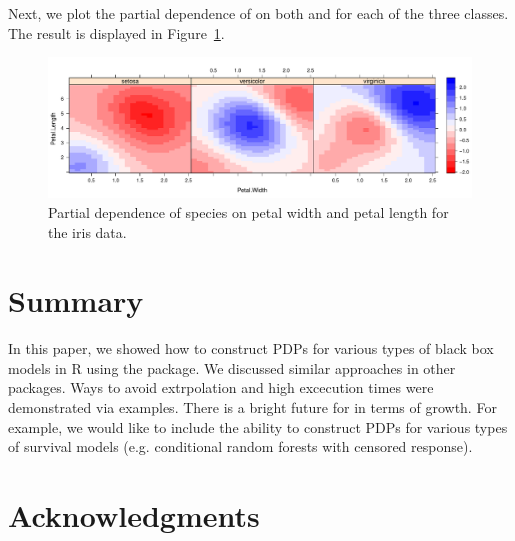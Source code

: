 Next, we plot the partial dependence of  on both  and  for each of the three classes. The result is displayed in Figure~\ref{fig:partial_iris}.

\begin{figure}[htbp]
  \centering
  \includegraphics[width=1.0\linewidth]{partial_iris_svm}
  \caption{Partial dependence of species on petal width and petal length for the iris data.}
  \label{fig:partial_iris}
\end{figure}


\section{Summary}

In this paper, we showed how to construct PDPs for various types of black box models in R using the  package. We discussed similar approaches in other packages. Ways to avoid extrpolation and high excecution times were demonstrated via examples. There is a bright future for  in terms of growth. For example, we would like to include the ability to construct PDPs for various types of survival models (e.g. conditional random forests with censored response).


\section{Acknowledgments}

